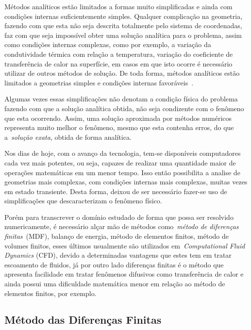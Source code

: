 \documentclass[
	12pt,				  %
	openright,		%
	twoside,			%
	a4paper,			%
	chapter=TITLE,		    %
	english,			%
	brazil				%
	]{abntex2}
\begin{document}
Métodos analíticos estão limitados a formas muito simplificadas e ainda com
condições internas suficientemente simples. Qualquer complicação na geometria,
fazendo com que esta não seja descrita totalmente pelo sistema de coordenadas,
faz com que seja impossível obter uma solução analítica para o problema, assim
como condições internas complexas, como por exemplo, a variação da
condutividade térmica com relação a temperatura, variação do coeficiente de
transferência de calor na superfície, em casos em que isto ocorre é necessário
utilizar de outros métodos de solução. De toda forma, métodos analíticos estão
limitados a geometrias simples e condições internas
favoráveis~\cite{cengel2015}.

Algumas vezes essas simplificações não denotam a condição física do problema
fazendo com que a solução analítica obtida, não seja condizente com o fenômeno
que esta ocorrendo. Assim, uma solução aproximada por métodos numéricos
representa muito melhor o fenômeno, mesmo que esta contenha erros, do que
a~\textit{solução exata}, obtida de forma analítica. 

Nos dias de hoje, com o avanço da tecnologia, tem-se disponíveis computadores
cada vez mais potentes, ou seja, capazes de realizar uma quantidade maior de
operações matemáticas em um menor tempo. Isso então possibilita a analise de
geometrias mais complexas, com condições internas mais complexas, muitas vezes
em estado transiente. Desta forma, deixou de ser necessário fazer-se uso de
simplificações que descaracterizam o fenômeno físico. 

Porém para transcrever o domínio estudado de forma que possa ser resolvido
numericamente, é necessário alçar mão de métodos como~\textit{método de
diferenças finitas}~(MDF), balanço de energia, método de elementos finitos,
método de volumes finitos, esses últimos usualmente são utilizados
em~\textit{Computational Fluid Dynamics} (CFD), devido a determinadas vantagens
que estes tem em tratar escoamento de fluidos, já por outro lado diferenças
finitas é o método que apresenta facilidade em tratar fenômenos difusivos como
transferência de calor e ainda possui uma dificuldade matemática menor em
relação ao método de elementos finitos, por exemplo.

\subsection{Método das Diferenças Finitas}\label{sec:diffin}
\end{document}

